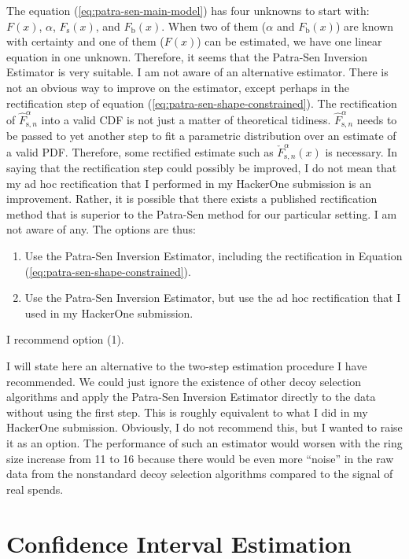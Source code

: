\documentclass[english]{article}
\begin{document}
The equation (\ref{eq:patra-sen-main-model}) has four unknowns to
start with: $F(x)$, $\alpha$, $F_{\mathrm{s}}(x)$, and $F_{\mathrm{b}}(x)$.
When two of them ($\alpha$ and $F_{\mathrm{b}}(x)$) are known with
certainty and one of them ($F(x)$) can be estimated, we have one
linear equation in one unknown. Therefore, it seems that the Patra-Sen
Inversion Estimator is very suitable. I am not aware of an alternative
estimator. There is not an obvious way to improve on the estimator,
except perhaps in the rectification step of equation (\ref{eq:patra-sen-shape-constrained}).
The rectification of $\hat{F}_{\mathrm{s},n}^{\alpha}$ into a valid
CDF is not just a matter of theoretical tidiness. $\hat{F}_{\mathrm{s},n}^{\alpha}$
needs to be passed to yet another step to fit a parametric distribution
over an estimate of a valid PDF. Therefore, some rectified estimate
such as $\check{F}_{\mathrm{s},n}^{\alpha}(x)$ is necessary. In saying
that the rectification step could possibly be improved, I do not mean
that my ad hoc rectification that I performed in my HackerOne submission
is an improvement. Rather, it is possible that there exists a published
rectification method that is superior to the Patra-Sen method for
our particular setting. I am not aware of any. The options are thus:
\begin{enumerate}
\item Use the Patra-Sen Inversion Estimator, including the rectification
in Equation (\ref{eq:patra-sen-shape-constrained}).
\item Use the Patra-Sen Inversion Estimator, but use the ad hoc rectification
that I used in my HackerOne submission.
\end{enumerate}
I recommend option (1).

I will state here an alternative to the two-step estimation procedure
I have recommended. We could just ignore the existence of other decoy
selection algorithms and apply the Patra-Sen Inversion Estimator directly
to the data without using the first step. This is roughly equivalent
to what I did in my HackerOne submission. Obviously, I do not recommend
this, but I wanted to raise it as an option. The performance of such
an estimator would worsen with the ring size increase from 11 to 16
because there would be even more ``noise'' in the raw data from
the nonstandard decoy selection algorithms compared to the signal
of real spends.

\section{Confidence Interval Estimation\label{sec:Confidence-Interval-Estimation}}
\end{document}
